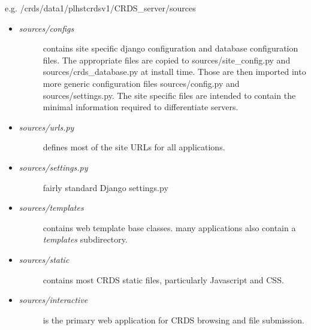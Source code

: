 \documentclass[letterpaper,10pt,english]{sphinxmanual}
\begin{document}
e.g. /crds/data1/plhstcrdsv1/CRDS\_server/sources
\begin{itemize}
\item {} \begin{description}
\item[{\emph{sources/configs}}] \leavevmode
contains site specific django configuration and database configuration files.  The appropriate files
are copied to sources/site\_config.py and sources/crds\_database.py at install time.   Those are then
imported into more generic configuration files sources/config.py and sources/settings.py.   The site
specific files are intended to contain the minimal information required to differentiate servers.

\end{description}

\item {} \begin{description}
\item[{\emph{sources/urls.py}}] \leavevmode
defines most of the site URLs for all applications.

\end{description}

\item {} \begin{description}
\item[{\emph{sources/settings.py}}] \leavevmode
fairly standard Django settings.py

\end{description}

\item {} \begin{description}
\item[{\emph{sources/templates}}] \leavevmode
contains web template base classes.  many applications also contain a \emph{templates} subdirectory.

\end{description}

\item {} \begin{description}
\item[{\emph{sources/static}}] \leavevmode
contains most CRDS static files,  particularly Javascript and CSS.

\end{description}

\item {} \begin{description}
\item[{\emph{sources/interactive}}] \leavevmode
is the primary web application for CRDS browsing and file submission.


\end{description}
\end{itemize}
\end{document}
